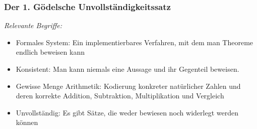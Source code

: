 \documentclass[aspectratio=1610,onlymath]{beamer}
\begin{document}
\maketitle


\begin{frame}\frametitle{Der 1. Gödelsche Unvollständigkeitssatz}

\bigskip

\emph{Relevante Begriffe:}
\begin{itemize}
\item \alert{Formales System:} Ein implementierbares Verfahren, mit dem man Theoreme endlich beweisen kann
\item \alert{Konsistent:} Man kann niemals eine Aussage und ihr Gegenteil beweisen.
\item \alert{Gewisse Menge Arithmetik:} Kodierung konkreter natürlicher Zahlen und deren korrekte Addition, Subtraktion, Multiplikation und Vergleich
\item \alert{Unvollständig:} Es gibt Sätze, die weder bewiesen noch widerlegt werden können
\end{itemize}

\end{frame}
\end{document}
